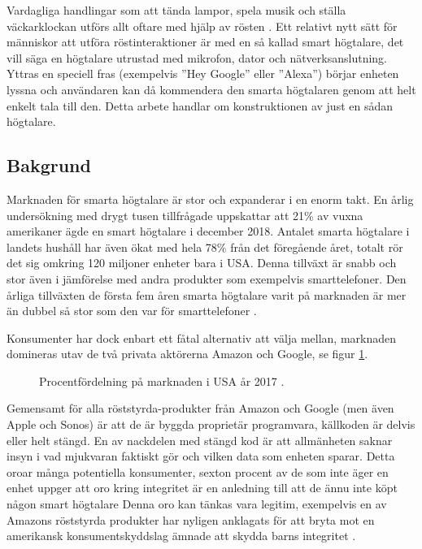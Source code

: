 Vardagliga handlingar som att tända lampor, spela musik och ställa väckar\-klockan utförs allt oftare med hjälp av rösten \cite{voicebot}. Ett relativt nytt sätt för människor att utföra röstinteraktioner är med en så kallad smart högtalare, det vill säga en högtalare utrustad med mikrofon, dator och nätverksanslutning. Yttras en speciell fras (exempelvis ”Hey Google” eller ”Alexa”) börjar enheten lyssna och användaren kan då kommendera den smarta högtalaren genom att helt enkelt tala till den. Detta arbete handlar om konstruktionen av just en sådan högtalare.

\subsection{Bakgrund}
Marknaden för smarta högtalare är stor och expanderar i en enorm takt. En årlig undersökning \cite{edison_npr2018} med drygt tusen tillfrågade uppskattar att 21\% av vuxna amerikaner ägde en smart högtalare i december 2018. Antalet smarta högtalare i landets hushåll har även ökat med hela 78\% från det föregående året, totalt rör det sig omkring 120 miljoner enheter bara i USA. Denna tillväxt är snabb och stor även i jämförelse med andra produkter som exempelvis smarttelefoner. Den årliga tillväxten de första fem åren smarta högtalare varit på marknaden är mer än dubbel så stor som den var för smarttelefoner \cite{capgemini}.

Konsumenter har dock enbart ett fåtal alternativ att välja mellan, marknaden domineras utav de två privata aktörerna Amazon och Google, se figur \ref{fig:speaker_market_share}. 
\begin{figure}[h]
    \centering
    \caption{\small Procentfördelning på marknaden i USA år 2017 \cite{voicebot}.}
    \label{fig:speaker_market_share}    
\end{figure}
Gemensamt för alla röststyrda-produkter från Amazon och Google (men även Apple och Sonos) är att de är byggda proprietär programvara, källkoden är delvis eller helt stängd. En av nackdelen med stängd kod är att allmänheten saknar insyn i vad mjukvaran faktiskt gör och vilken data som enheten sparar. Detta oroar många potentiella konsumenter, sexton procent av de som inte äger en enhet uppger att oro kring integritet är en anledning till att de ännu inte köpt någon smart högtalare \cite{voicebot} Denna oro kan tänkas vara legitim, exempelvis en av Amazons röststyrda produkter har nyligen anklagats för att bryta mot en amerikansk konsumentskyddslag ämnade att skydda barns integritet \cite{intercept}.

